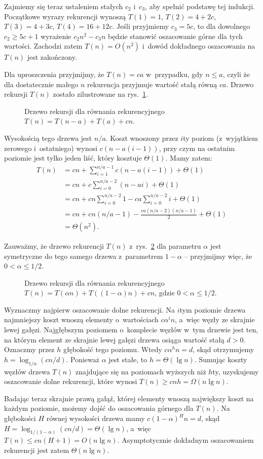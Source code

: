 Zajmiemy się teraz ustaleniem stałych $c_2$ i~$c_3$, aby spełnić podstawę tej indukcji.
Początkowe wyrazy rekurencji wynoszą $T(1)=1$, $T(2)=4+2c$, $T(3)=4+3c$, $T(4)=16+12c$.
Jeśli przyjmiemy $c_3=5c$, to dla dowolnego $c_2\ge5c+1$ wyrażenie $c_2n^2-c_3n$ będzie stanowić oszacowanie górne dla tych wartości.
Zachodzi zatem $T(n)=O(n^2)$ i~dowód dokładnego oszacowania na $T(n)$ jest zakończony.

\exercise %
Dla uproszczenia przyjmijmy, że $T(n)=ca$ w~przypadku, gdy $n\le a$, czyli że dla dostatecznie małego $n$ rekurencja przyjmuje wartość stałą równą $ca$.
Drzewo rekursji $T(n)$ zostało zilustrowane na rys.\ \ref{fig:4.2-4}.
\begin{figure}[!ht]
	\centering 
	\caption{Drzewo rekursji dla równania rekurencyjnego $T(n)=T(n-a)+T(a)+cn$.} \label{fig:4.2-4}
\end{figure}
Wysokością tego drzewa jest $n/a$.
Koszt wnoszony przez $i$\nbhyphen ty poziom (z~wyjątkiem zerowego i~ostatniego) wynosi $c(n-a(i-1))$, przy czym na ostatnim poziomie jest tylko jeden liść, który kosztuje $\Theta(1)$.
Mamy zatem:
\begin{align*}
	T(n) &= cn+\sum_{i=1}^{n/a-1}c(n-a(i-1))+\Theta(1) \\
	&= cn+c\sum_{i=0}^{n/a-2}(n-ai)+\Theta(1) \\
	&= cn+cn\sum_{i=0}^{n/a-2}1-ca\sum_{i=0}^{n/a-2}i+\Theta(1) \\
	&= cn+cn(n/a-1)-\frac{ca(n/a-2)(n/a-1)}{2}+\Theta(1) \\
	&= \Theta(n^2).
\end{align*}

\exercise %
Zauważmy, że drzewo rekurencji $T(n)$ z~rys.\ \ref{fig:4.2-5} dla parametru $\alpha$ jest symetryczne do tego samego drzewa z~parametrem $1-\alpha$ -- przyjmijmy więc, że $0<\alpha\le1/2$.
\begin{figure}[!ht]
	\centering 
	\caption{Drzewo rekursji dla równania rekurencyjnego $T(n)=T(\alpha n)+T((1-\alpha)n)+cn$, gdzie $0<\alpha\le1/2$.} \label{fig:4.2-5}
\end{figure}

Wyznaczmy najpierw oszacowanie dolne rekurencji.
Na $i$\nbhyphen tym poziomie drzewa najmniejszy koszt wnoszą elementy o~wartościach $c\alpha^in$, a~więc węzły ze skrajnie lewej gałęzi.
Najgłębszym poziomem o~komplecie węzłów w~tym drzewie jest ten, na którym element ze skrajnie lewej gałęzi drzewa osiąga wartość stałą $d>0$.
Oznaczmy przez $h$ głębokość tego poziomu.
Wtedy $c\alpha^hn=d$, skąd otrzymujemy $h=\log_{1/\alpha}(cn/d)$.
Ponieważ $\alpha$ jest stałe, to $h=\Theta(\lg n)$.
Sumując koszty węzłów drzewa $T(n)$ znajdujące się na poziomach wyższych niż $h$\nbhyphen ty, uzyskujemy oszacowanie dolne rekurencji, które wynosi $T(n)\ge cnh=\Omega(n\lg n)$.

Badając teraz skrajnie prawą gałąź, której elementy wnoszą największy koszt na każdym poziomie, możemy dojść do oszacowania górnego dla $T(n)$.
Na głębokości $H$ równej wysokości drzewa mamy $c(1-\alpha)^Hn=d$, skąd $H=\log_{1/(1-\alpha)}(cn/d)=\Theta(\lg n)$, a~więc $T(n)\le cn(H+1)=O(n\lg n)$.
Asymptotycznie dokładnym oszacowaniem rekurencji jest zatem $\Theta(n\lg n)$.
